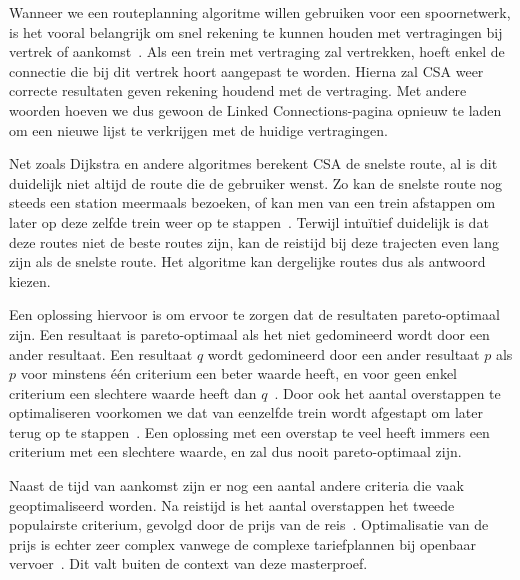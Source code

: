Wanneer we een routeplanning algoritme willen gebruiken voor een spoornetwerk, is het vooral belangrijk om snel rekening te kunnen houden met vertragingen bij vertrek of aankomst~\citep{strasser14,strasser17}. Als een trein met vertraging zal vertrekken, hoeft enkel de connectie die bij dit vertrek hoort aangepast te worden. Hierna zal CSA weer correcte resultaten geven rekening houdend met de vertraging. Met andere woorden hoeven we dus gewoon de Linked Connections-pagina opnieuw te laden om een nieuwe lijst te verkrijgen met de huidige vertragingen. 

Net zoals Dijkstra en andere algoritmes berekent CSA de snelste route, al is dit duidelijk niet altijd de route die de gebruiker wenst. Zo kan de snelste route nog steeds een station meermaals bezoeken, of kan men van een trein afstappen om later op deze zelfde trein weer op te stappen~\citep{strasser14}. Terwijl intuïtief duidelijk is dat deze routes niet de beste routes zijn, kan de reistijd bij deze trajecten even lang zijn als de snelste route. Het algoritme kan dergelijke routes dus als antwoord kiezen.

Een oplossing hiervoor is om ervoor te zorgen dat de resultaten pareto-optimaal zijn. Een resultaat is pareto-optimaal als het niet gedomineerd wordt door een ander resultaat. Een resultaat $q$ wordt gedomineerd door een ander resultaat $p$ als $p$ voor minstens één criterium een beter waarde heeft, en voor geen enkel criterium een slechtere waarde heeft dan $q$~\citep{hannemann08,strasser17}. Door ook het aantal overstappen te optimaliseren voorkomen we dat van eenzelfde trein wordt afgestapt om later terug op te stappen~\citep{strasser14}. Een oplossing met een overstap te veel heeft immers een criterium met een slechtere waarde, en zal dus nooit pareto-optimaal zijn.

Naast de tijd van aankomst zijn er nog een aantal andere criteria die vaak geoptimaliseerd worden. Na reistijd is het aantal overstappen het tweede populairste criterium, gevolgd door de prijs van de reis~\citep{strasser17}. Optimalisatie van de prijs is echter zeer complex vanwege de complexe tariefplannen bij openbaar vervoer~\citep{muller06}. Dit valt buiten de context van deze masterproef.

